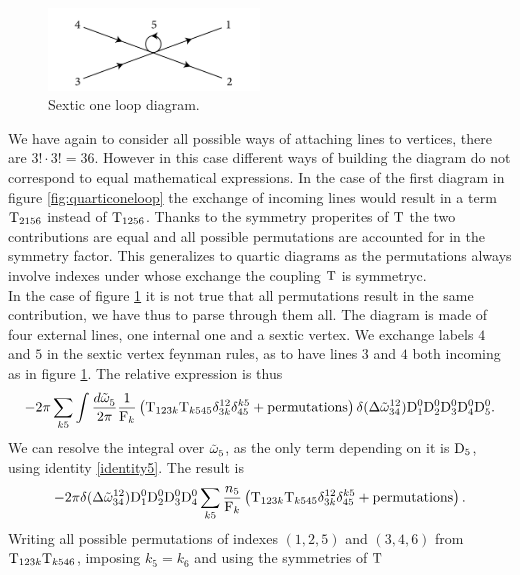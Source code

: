\begin{figure}[ht]
    \centering
    \includegraphics[width=0.5\textwidth]{images/sexticdiagram.jpg}
    \caption{Sextic one loop diagram.}
    \label{fig:sexticoneloop}
\end{figure}
We have again to consider all possible ways of attaching lines to vertices, there are  $3!\cdot3! = 36$. However in this case different ways of building the diagram do not correspond to 
equal mathematical expressions. In the case of the first diagram in figure \ref{fig:quarticoneloop} the exchange of incoming lines would result in a term $\mathrm{T}_{2156}$
instead of $\mathrm{T}_{1256}$. Thanks to the symmetry properites of $\mathrm{T}$ the two contributions are equal and all possible permutations are accounted for in the symmetry factor.
This generalizes to quartic diagrams as the permutations always involve indexes under whose exchange the coupling $\mathrm{T}$ is symmetryc.\\ 
In the case of figure \ref{fig:sexticoneloop} it is not true that all permutations result in the same contribution, we have thus to parse through them all. The diagram 
is made of four external lines, one internal one and a sextic vertex. We exchange labels $4$ and $5$ in the sextic vertex feynman rules, as to have lines $3$ and 
$4$ both incoming as in figure \ref{fig:sexticoneloop}. The relative expression is thus  
\begin{equation}
    -2\pi \sum_{k5}\int\frac{d\tilde{\omega}^{}_5}{2\pi} \frac{1}{\mathrm{F}_k}\left(\mathrm{T}_{123k}\mathrm{T}_{k545}\delta^{12}_{3k}
    \delta^{k5}_{45} + \text{permutations}\right)\delta(\Delta{\tilde{\omega}}^{12}_{34})
    \mathrm{D}_1^0\mathrm{D}_2^0\mathrm{D}_3^0\mathrm{D}_4^0\mathrm{D}_5^0.
\end{equation}
We can resolve the integral over $\tilde{\omega}^{}_5$, as the only term depending on it is $\mathrm{D}_5$, using identity \eqref{identity5}. The result is
\begin{equation}
    -2\pi \delta(\Delta{\tilde{\omega}}^{12}_{34})\mathrm{D}_1^0\mathrm{D}_2^0\mathrm{D}_3^0\mathrm{D}_4^0 \sum_{k5}
    \frac{n_5}{\mathrm{F}_k}\left(\mathrm{T}_{123k}\mathrm{T}_{k545}\delta^{12}_{3k}
    \delta^{k5}_{45} + \text{permutations}\right).
\end{equation}
Writing all possible permutations of indexes $(1,2,5)$ and $(3,4,6)$ from $\mathrm{T}_{123k}\mathrm{T}_{k546}$, imposing $k_5 = k_6$ and using the symmetries of $\mathrm{T}$ 
